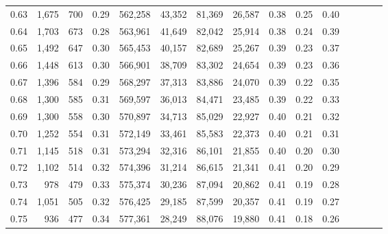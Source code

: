 \begin{tabular}{rrrcrrrrrrrrrrr}
0.63 &   1,675 &     700 &                                       0.29 &  562,258 &   43,352 &   81,369 &   26,587 &  0.38 &  0.25 &                         0.40 \\
0.64 &   1,703 &     673 &                                       0.28 &  563,961 &   41,649 &   82,042 &   25,914 &  0.38 &  0.24 &                         0.39 \\
0.65 &   1,492 &     647 &                                       0.30 &  565,453 &   40,157 &   82,689 &   25,267 &  0.39 &  0.23 &                         0.37 \\
0.66 &   1,448 &     613 &                                       0.30 &  566,901 &   38,709 &   83,302 &   24,654 &  0.39 &  0.23 &                         0.36 \\
0.67 &   1,396 &     584 &                                       0.29 &  568,297 &   37,313 &   83,886 &   24,070 &  0.39 &  0.22 &                         0.35 \\
0.68 &   1,300 &     585 &                                       0.31 &  569,597 &   36,013 &   84,471 &   23,485 &  0.39 &  0.22 &                         0.33 \\
0.69 &   1,300 &     558 &                                       0.30 &  570,897 &   34,713 &   85,029 &   22,927 &  0.40 &  0.21 &                         0.32 \\
0.70 &   1,252 &     554 &                                       0.31 &  572,149 &   33,461 &   85,583 &   22,373 &  0.40 &  0.21 &                         0.31 \\
0.71 &   1,145 &     518 &                                       0.31 &  573,294 &   32,316 &   86,101 &   21,855 &  0.40 &  0.20 &                         0.30 \\
0.72 &   1,102 &     514 &                                       0.32 &  574,396 &   31,214 &   86,615 &   21,341 &  0.41 &  0.20 &                         0.29 \\
0.73 &     978 &     479 &                                       0.33 &  575,374 &   30,236 &   87,094 &   20,862 &  0.41 &  0.19 &                         0.28 \\
0.74 &   1,051 &     505 &                                       0.32 &  576,425 &   29,185 &   87,599 &   20,357 &  0.41 &  0.19 &                         0.27 \\
0.75 &     936 &     477 &                                       0.34 &  577,361 &   28,249 &   88,076 &   19,880 &  0.41 &  0.18 &                         0.26 \\

\end{tabular}
